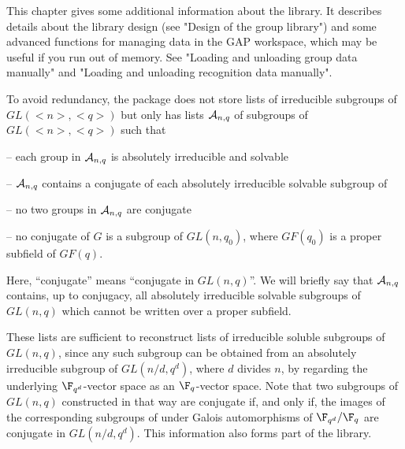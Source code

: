 
This chapter gives some additional information about the {\IRREDSOL} library.
It describes details about the library design (see "Design of the group library")
and some advanced functions for managing data in the GAP workspace, which may be
useful if you run out of memory. See "Loading and unloading group data manually"
and "Loading and unloading recognition data manually".


To avoid redundancy, the package {\IRREDSOL} does not store 
lists of irreducible subgroups of $GL(<n>, <q>)$ but
only has lists ${\cal
A}_{n,q}$ of subgroups of $GL(<n>, <q>)$ such that

\beginlist
\item{--} each group in ${\cal A}_{n,q}$ is absolutely irreducible and
solvable

\item{--} ${\cal A}_{n,q}$ contains a conjugate of each absolutely
irreducible solvable subgroup of

\item{--} no two groups in ${\cal A}_{n,q}$ are conjugate

\item{--} no conjugate of $G$ is a subgroup of $GL(n, q_0)$, where
$GF(q_0)$ is a proper subfield of $GF(q)$.

\endlist Here, ``conjugate'' means ``conjugate in $GL(n,q)$''. We will
briefly say that ${\cal A}_{n,q}$ contains, up to conjugacy, all absolutely
irreducible solvable subgroups of $GL(n,q)$ which cannot be written over a
proper subfield.

These lists are sufficient to reconstruct lists of irreducible soluble
subgroups of $GL(n, q)$, since  any such subgroup can be obtained from an
absolutely irreducible subgroup of $GL(n/d, q^d)$, where $d$ divides $n$,
by regarding the underlying $\F_{q^d}$-vector space as an $\F_q$-vector
space. Note that two subgroups of $GL(n, q)$ constructed in that way are
conjugate if, and only if, the images of the corresponding subgroups of
under Galois automorphisms of $\F_{q^d}/\F_q$ are conjugate in $GL(n/d, q^d)$.
This information also forms part of the {\IRREDSOL} library.

